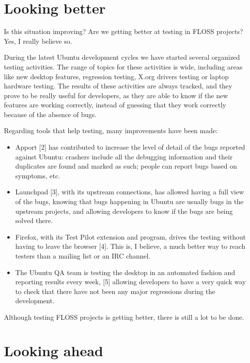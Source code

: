 \section*{Looking better}

Is this situation improving? Are we getting better at testing in FLOSS projects? Yes, I really believe so.

During the latest Ubuntu development cycles we have started several organized testing activities. The range of topics for these activities is wide, including areas like new desktop features, regression testing, X.org drivers testing or laptop hardware testing. The results of these activities are always tracked, and they prove to be really useful for developers, as they are able to know if the new features are working correctly, instead of guessing that they work correctly because of the absence of bugs.

Regarding tools that help testing, many improvements have been made:
\begin{itemize}
 \item Apport [2] has contributed to increase the level of detail of the bugs reported against Ubuntu: crashers include all the debugging information and their duplicates are found and marked as such; people can report bugs based on symptoms, etc.
 \item Launchpad [3], with its upstream connections, has allowed having a full view of the bugs, knowing that bugs happening in Ubuntu are usually bugs in the upstream projects, and allowing developers to know if the bugs are being solved there. 
 \item Firefox, with its Test Pilot extension and program, drives the testing without having to leave the browser [4]. This is, I believe, a much better way to reach testers than a mailing list or an IRC channel.
 \item The Ubuntu QA team is testing the desktop in an automated fashion and reporting results every week, [5] allowing developers to have a very quick way to check that there have not been any major regressions during the development.
\end{itemize}

Although testing FLOSS projects is getting better, there is still a lot to be done.

\section*{Looking ahead}


